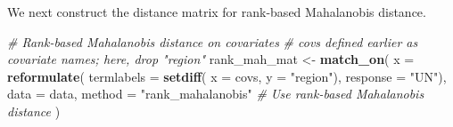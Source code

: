 \documentclass[
  12pt,
  leqno]{article}
\newenvironment{Shaded}{\begin{snugshade}}{\end{snugshade}}
\newcommand{\AttributeTok}[1]{\textcolor[rgb]{0.13,0.29,0.53}{#1}}
\newcommand{\CommentTok}[1]{\textcolor[rgb]{0.56,0.35,0.01}{\textit{#1}}}
\newcommand{\DecValTok}[1]{\textcolor[rgb]{0.00,0.00,0.81}{#1}}
\newcommand{\FloatTok}[1]{\textcolor[rgb]{0.00,0.00,0.81}{#1}}
\newcommand{\FunctionTok}[1]{\textcolor[rgb]{0.13,0.29,0.53}{\textbf{#1}}}
\newcommand{\NormalTok}[1]{#1}
\newcommand{\OtherTok}[1]{\textcolor[rgb]{0.56,0.35,0.01}{#1}}
\newcommand{\SpecialCharTok}[1]{\textcolor[rgb]{0.81,0.36,0.00}{\textbf{#1}}}
\newcommand{\StringTok}[1]{\textcolor[rgb]{0.31,0.60,0.02}{#1}}
\begin{document}
\begin{Shaded}
\end{Shaded}

\doublespacing

We next construct the distance matrix for rank-based Mahalanobis
distance.

\singlespacing

\begin{Shaded}
\begin{Highlighting}[]
\CommentTok{\# Rank{-}based Mahalanobis distance on covariates}
\CommentTok{\# covs defined earlier as covariate names; here, drop "region"}
\NormalTok{rank\_mah\_mat }\OtherTok{\textless{}{-}} \FunctionTok{match\_on}\NormalTok{(}
  \AttributeTok{x      =} \FunctionTok{reformulate}\NormalTok{(}
    \AttributeTok{termlabels =} \FunctionTok{setdiff}\NormalTok{(}
      \AttributeTok{x =}\NormalTok{ covs,}
      \AttributeTok{y =} \StringTok{"region"}\NormalTok{),}
    \AttributeTok{response   =} \StringTok{"UN"}\NormalTok{),}
  \AttributeTok{data   =}\NormalTok{ data,}
  \AttributeTok{method =} \StringTok{"rank\_mahalanobis"} \CommentTok{\# Use rank{-}based Mahalanobis distance}
\NormalTok{)}
\end{Highlighting}
\end{Shaded}
\end{document}

